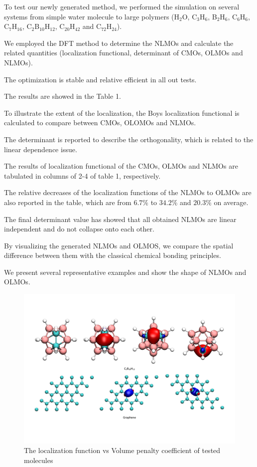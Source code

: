 \documentclass[aps,prl,reprint,amsmath,amssymb]{revtex4-1}
\begin{document}
To test our newly generated method, we performed the simulation on several systems from simple water molecule to large polymers (H$_2$O, C$_3$H$_6$, B$_2$H$_6$, C$_6$H$_6$, C$_7$H$_{16}$, C$_2$B$_{10}$H$_{12}$, C$_{20}$H$_{42}$ and C$_{72}$H$_{24}$).

We employed the DFT method to determine the NLMOs and calculate the related quantities (localization functional, determinant of CMOs, OLMOs and NLMOs).

The optimization is stable and relative efficient in all out tests.

The results are showed in the Table 1. 

To illustrate the extent of the localization,  the Boys localization functional is calculated to compare between CMOs, OLOMOs and NLMOs.

The determinant is reported to describe the orthogonality, which is related to the linear dependence issue.

The results of localization functional of the CMOs, OLMOs and NLMOs are tabulated in columns of 2-4 of table 1, respectively.

The relative decreases of the localization functions of the NLMOs to OLMOs are also reported in the table, which are from $6.7\%$ to $34.2\%$ and $20.3\%$ on average.

The final determinant value has showed that all obtained NLMOs are linear independent and do not collapse onto each other.

By visualizing the generated NLMOs and OLMOS, we compare the spatial difference between them with the classical chemical bonding principles.

We present several representative examples and show the shape of NLMOs and OLMOs.


\begin{figure}[hbpt]
\centering
\includegraphics[width=\textwidth]{figure_2.pdf}
\caption{The localization function vs Volume penalty coefficient of tested molecules}
\end{figure}
\end{document}

